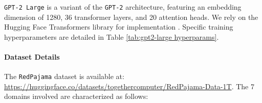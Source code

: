 \documentclass{article} %
\newcommand{\call}[1]{\textbf{\textcolor{orange}{[Call: #1]}}}
\newcommand{\kang}[1]{\textbf{\textcolor{cyan}{[Feiyang: #1]}}}
\begin{document}
\begin{appendices}{}
\texttt{GPT-2 Large} is a variant of the \texttt{GPT-2} architecture, featuring an embedding dimension of 1280, 36 transformer layers, and 20 attention heads. We rely on the Hugging Face Transformers library for implementation \citep{wolf2019huggingface}. Specific training hyperparameters are detailed in Table \ref{tab:gpt2-large hyperparams}.

\begin{table}[h]
\end{table} 




\paragraph{Dataset Details}

The \texttt{RedPajama} dataset is available at: \url{https://huggingface.co/datasets/togethercomputer/RedPajama-Data-1T}.
The 7 domains involved are characterized as follows: 


\end{appendices}
\end{document}
